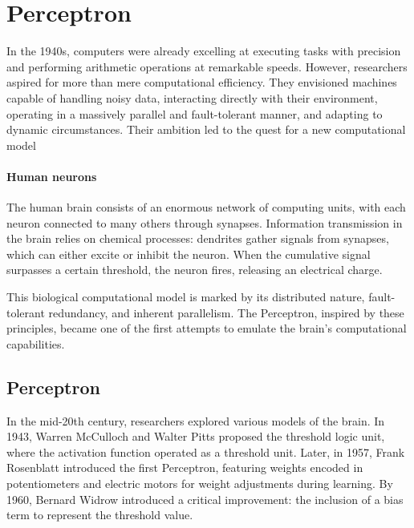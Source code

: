 \section{Perceptron}

In the 1940s, computers were already excelling at executing tasks with precision and performing arithmetic operations at remarkable speeds. 
However, researchers aspired for more than mere computational efficiency. 
They envisioned machines capable of handling noisy data, interacting directly with their environment, operating in a massively parallel and fault-tolerant manner, and adapting to dynamic circumstances.
Their ambition led to the quest for a new computational model

\paragraph*{Human neurons}
The human brain consists of an enormous network of computing units, with each neuron connected to many others through synapses. 
Information transmission in the brain relies on chemical processes: dendrites gather signals from synapses, which can either excite or inhibit the neuron. 
When the cumulative signal surpasses a certain threshold, the neuron fires, releasing an electrical charge.

This biological computational model is marked by its distributed nature, fault-tolerant redundancy, and inherent parallelism. 
The Perceptron, inspired by these principles, became one of the first attempts to emulate the brain's computational capabilities.

\subsection{Perceptron}
In the mid-20th century, researchers explored various models of the brain. 
In 1943, Warren McCulloch and Walter Pitts proposed the threshold logic unit, where the activation function operated as a threshold unit. 
Later, in 1957, Frank Rosenblatt introduced the first Perceptron, featuring weights encoded in potentiometers and electric motors for weight adjustments during learning. 
By 1960, Bernard Widrow introduced a critical improvement: the inclusion of a bias term to represent the threshold value.

